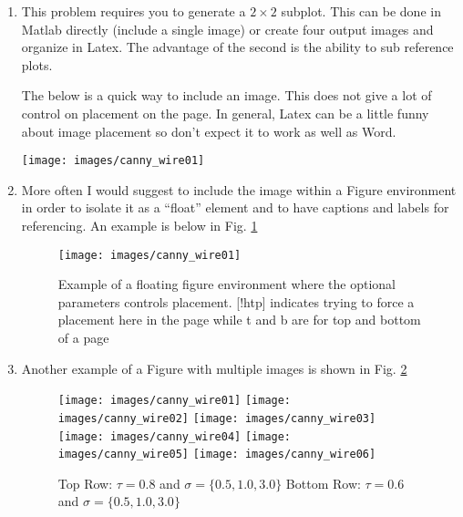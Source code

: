\documentclass[letterpaper,11pt]{article}
\begin{document}
\begin{enumerate}
\begin{enumerate}
\item This problem requires you to generate a $2\times2$ subplot.  This can be done in Matlab directly (include a single image) or create four output images and organize in Latex.  The advantage of the second is the ability to sub reference plots.  

The below is a quick way to include an image.  This does not give a lot of control on placement on the page.  In general, Latex can be a little funny about image placement so don't expect it to work as well as Word.

{\centering
\texttt{[image: images/canny\_wire01]}\\
}

\item More often I would suggest to include the image within a Figure environment in order to isolate it as a ``float'' element and to have captions and labels for referencing.  An example is below in Fig. \ref{fig:01}

\begin{figure}[!htb]
\centering
\texttt{[image: images/canny\_wire01]}
\caption{Example of a floating figure environment where the optional parameters controls placement. [!htp] indicates trying to force a placement here in the page while t and b are for top and bottom of a page}
\label{fig:01}
\end{figure}


\item Another example of a Figure with multiple images is shown in Fig. \ref{fig:canny_wire}

\begin{figure}
\centering
\texttt{[image: images/canny\_wire01]}
\texttt{[image: images/canny\_wire02]}
\texttt{[image: images/canny\_wire03]}\\
\texttt{[image: images/canny\_wire04]}
\texttt{[image: images/canny\_wire05]}
\texttt{[image: images/canny\_wire06]}
\caption{Top Row: $\tau=0.8$ and $\sigma=\{0.5, 1.0, 3.0\}$ Bottom Row: $\tau=0.6$ and $\sigma=\{0.5, 1.0, 3.0\}$}
\label{fig:canny_wire}
\end{figure}


\end{enumerate}
\end{enumerate}
\end{document}
